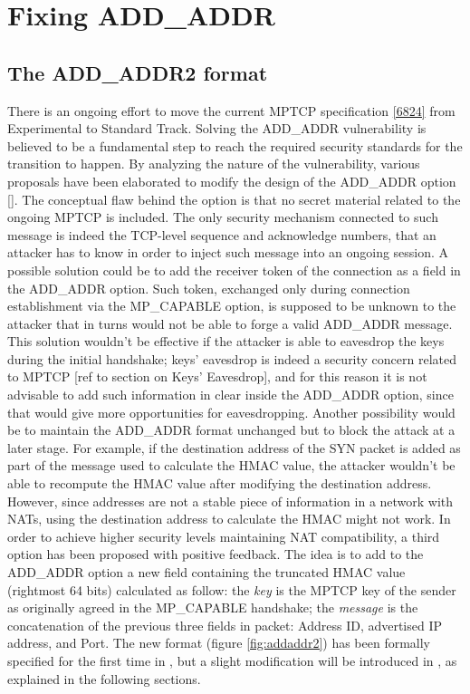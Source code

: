 \chapter{Fixing ADD\_ADDR}
\label{chap:addaddr2}

\section{The ADD\_ADDR2 format}
There is an ongoing effort to move the current MPTCP specification \ref{6824} from Experimental to Standard Track. Solving the ADD\_ADDR vulnerability is believed to be a fundamental step to reach the required security standards for the transition to happen.
By analyzing the nature of the vulnerability, various proposals have been elaborated to modify the design of the ADD\_ADDR option []. The conceptual flaw behind the option is that no secret material related to the ongoing MPTCP is included. The only security mechanism connected to such message is indeed the TCP-level sequence and acknowledge numbers, that an attacker has to know in order to inject such message into an ongoing session.
A possible solution could be to add the receiver token of the connection as a field in the ADD\_ADDR option. Such token, exchanged only during connection establishment via the MP\_CAPABLE option, is supposed to be unknown to the attacker that in turns would not be able to forge a valid ADD\_ADDR message. This solution wouldn't be effective if the attacker is able to eavesdrop the keys during the initial handshake; keys' eavesdrop is indeed a security concern related to MPTCP [ref to section on Keys' Eavesdrop], and for this reason it is not advisable to add such information in clear inside the ADD\_ADDR option, since that would give more opportunities for eavesdropping.
Another possibility would be to maintain the ADD\_ADDR format unchanged but to block the attack at a later stage. For example, if the destination address of the SYN packet is added as part of the message used to calculate the HMAC value, the attacker wouldn't be able to recompute the HMAC value after modifying the destination address. However, since addresses are not a stable piece of information in a network with NATs, using the destination address to calculate the HMAC might not work.
In order to achieve higher security levels maintaining NAT compatibility, a third option has been proposed with positive feedback. The idea is to add to the ADD\_ADDR option a new field containing the truncated HMAC value (rightmost 64 bits) calculated as follow: the \textit{key} is the MPTCP key of the sender as originally agreed in the MP\_CAPABLE handshake; the \textit{message} is the concatenation of the previous three fields in packet: Address ID, advertised IP address, and Port. The new format (figure \ref{fig:addaddr2}) has been formally specified for the first time in , but a slight modification will be introduced in , as explained in the following sections.

